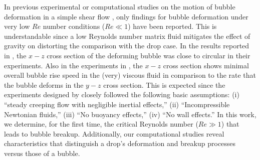 \documentclass{elsarticle}
\begin{document}
In previous experimental or computational studies on the motion of bubble deformation in a simple shear flow \cite{CanedoETAL,RusMan02, MulTobDreFisWin08}, only findings for bubble deformation under very low $Re$ number conditions ($Re \ll 1$) have been reported.  This is understandable since a low Reynolds number matrix fluid mitigates the effect of gravity on distorting the comparison with the drop case.  In the results reported in \cite{CanedoETAL}, the $x-z$ cross section of the deforming bubble was close to circular in their experiments.  Also in the experiments in \cite{CanedoETAL}, the $x-z$ cross section shows minimal overall bubble rise speed in the (very) viscous fluid in comparison to the rate that the bubble deforms in the $y-z$ cross section.  This is expected since the experiments designed by \cite{CanedoETAL} closely followed the following basic assumptions: (i) ``steady creeping flow with negligible inertial effects,'' (ii) ``Incompressible Newtonian fluids,'' (iii) ``No buoyancy effects,'' (iv) ``No wall effects.''  In this work, we determine, for the first time, the critical Reynolds number ($Re \gg 1$) that leads to bubble breakup.  Additionally, our computational studies reveal characteristics that distinguish a drop's deformation and breakup processes versus those of a bubble.
\par
\end{document}
